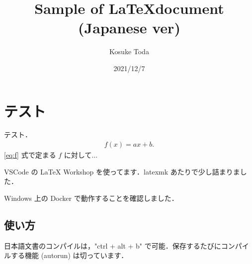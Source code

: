 \documentclass[dvipdfmx]{jsarticle}
\begin{document}
    \title{Sample of \LaTeX document (Japanese ver)}
    \author{Kosuke Toda}
    \date{2021/12/7}
    \maketitle

    \section{テスト}
    テスト．
    \begin{align}
        f(x) = ax + b. \label{eq:f}
    \end{align}
    \eqref{eq:f} 式で定まる $f$ に対して...

    VSCode の LaTeX Workshop を使ってます．latexmk あたりで少し詰まりました．

    Windows 上の Docker で動作することを確認しました．

    \subsection{使い方}
    日本語文書のコンパイルは，"ctrl + alt + b" で可能．保存するたびにコンパイルする機能 (autorun) は切っています．
\end{document}
